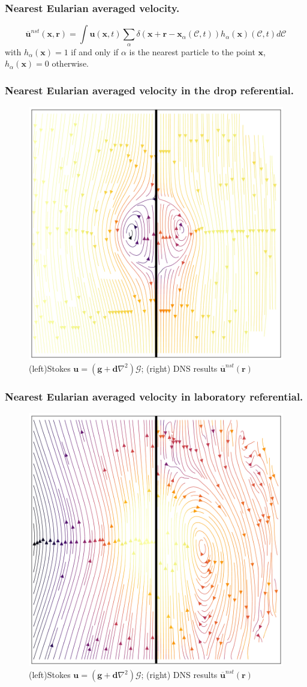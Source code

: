 \documentclass{sintefbeamer}
\newcommand{\nstavg}[1]{\overline{#1}^{nst}}
\newcommand{\CC}{\mathscr{C}}
\begin{document}
\begin{frame}
  \frametitle{Nearest Eularian averaged velocity. }

\begin{equation*}
  \nstavg{\textbf{u}}(\textbf{x},\textbf{r})
  = \int 
  \textbf{u}(\textbf{x},t)
  \sum_{\alpha}
  \delta(\textbf{x}+\textbf{r}-\textbf{x}_\alpha(\CC,t))
  h_\alpha(\textbf{x})(\CC,t)
  d\CC
\end{equation*}
with $h_\alpha(\textbf{x}) = 1$ if and only if $\alpha$ is the nearest particle to the point $\textbf{x}$, $h_\alpha(\textbf{x}) = 0$ otherwise. 
  

\end{frame}


\begin{frame}
  \frametitle{Nearest Eularian averaged velocity in the drop referential. }
  \centering
  
  \begin{figure}
    \includegraphics[height=0.4\textwidth]{image/Stream.png}
    \caption{(left)Stokes $\textbf{u} = (\textbf{g}+\textbf{d}\nabla^2) \mathcal{G}$; (right) DNS results $\nstavg{\textbf{u}}(\textbf{r})$ }
  \end{figure}
  \end{frame}
\begin{frame}
  \frametitle{Nearest Eularian averaged velocity in laboratory referential. }
  \centering
  
  \begin{figure}
    \includegraphics[height=0.4\textwidth]{image/Stream2.png}
    \caption{(left)Stokes $\textbf{u} = (\textbf{g}+\textbf{d}\nabla^2) \mathcal{G}$; (right) DNS results $\nstavg{\textbf{u}}(\textbf{r})$ }
  \end{figure}
  \end{frame}
\end{document}
